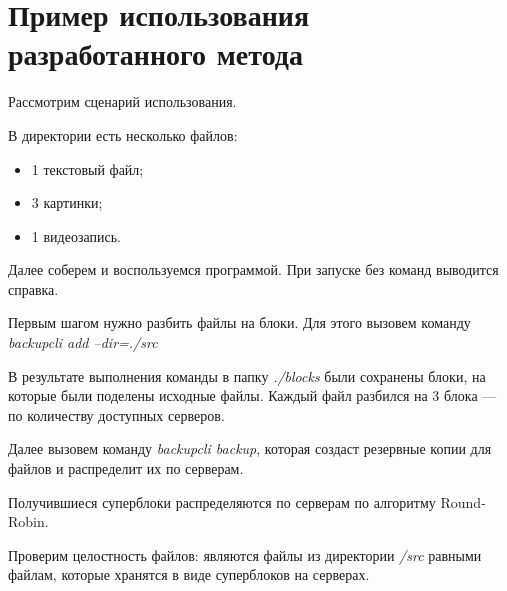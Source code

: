 
\newpage
{}
\newpage
\section{Пример использования разработанного метода}

Рассмотрим сценарий использования. 

\begin{flushleft}
В директории есть несколько файлов: 
\end{flushleft}
\begin{itemize}
\item 1 текстовый файл;
\item 3 картинки;
\item 1 видеозапись.
\end{itemize}

\newpage
Далее соберем и воспользуемся программой.  
При запуске без команд выводится справка.


Первым шагом нужно разбить файлы на блоки.  
Для этого вызовем команду \textit{backupcli add --dir=./src}

\newpage

В результате выполнения команды в папку \textit{./blocks} были сохранены блоки, на которые были поделены исходные файлы. Каждый файл разбился на 3 блока --- по количеству доступных серверов.  


\newpage
Далее вызовем команду \textit{backupcli backup}, которая создаст резервные копии для файлов и распределит их по серверам.  

Получившиеся суперблоки распределяются по серверам по алгоритму Round-Robin.  

\newpage

Проверим целостность файлов: являются файлы из директории \textit{/src} равными файлам, которые хранятся в виде суперблоков на серверах.

